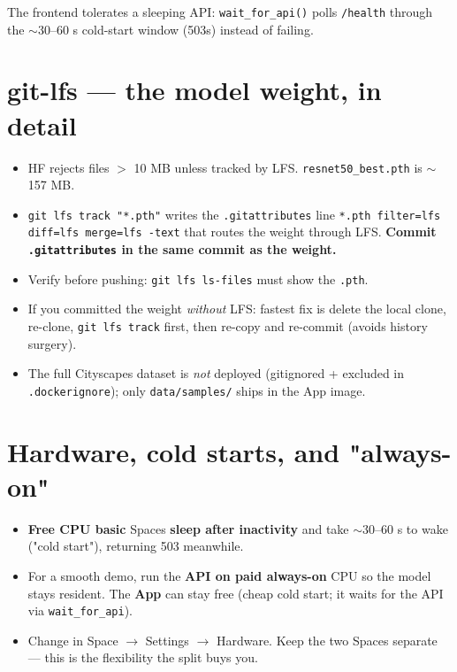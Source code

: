 \documentclass[11pt]{article}
\newcommand{\code}[1]{\lstinline[basicstyle=\ttfamily\normalsize]|#1|}
\newcommand{\rarr}{$\rightarrow$}
\begin{document}
\medskip
\noindent The frontend tolerates a sleeping API: \code{wait_for_api()} polls
\code{/health} through the $\sim$30--60 s cold-start window (503s) instead of
failing.

\section{git-lfs — the model weight, in detail}

\begin{itemize}
  \item HF rejects files $>$ 10 MB unless tracked by LFS. \code{resnet50_best.pth} is
    $\sim$157 MB.
  \item \code{git lfs track "*.pth"} writes the \code{.gitattributes} line
    \code{*.pth filter=lfs diff=lfs merge=lfs -text} that routes the weight through
    LFS. \textbf{Commit \code{.gitattributes} in the same commit as the weight.}
  \item Verify before pushing: \code{git lfs ls-files} must show the \code{.pth}.
  \item If you committed the weight \emph{without} LFS: fastest fix is delete the
    local clone, re-clone, \code{git lfs track} first, then re-copy and re-commit
    (avoids history surgery).
  \item The full Cityscapes dataset is \emph{not} deployed (gitignored + excluded in
    \code{.dockerignore}); only \code{data/samples/} ships in the App image.
\end{itemize}

\section{Hardware, cold starts, and "always-on"}

\begin{itemize}
  \item \textbf{Free CPU basic} Spaces \textbf{sleep after inactivity} and take
    $\sim$30--60 s to wake ("cold start"), returning 503 meanwhile.
  \item For a smooth demo, run the \textbf{API on paid always-on} CPU so the model
    stays resident. The \textbf{App} can stay free (cheap cold start; it waits for
    the API via \code{wait_for_api}).
  \item Change in Space \rarr{} Settings \rarr{} Hardware. Keep the two Spaces
    separate --- this is the flexibility the split buys you.
\end{itemize}
\end{document}
